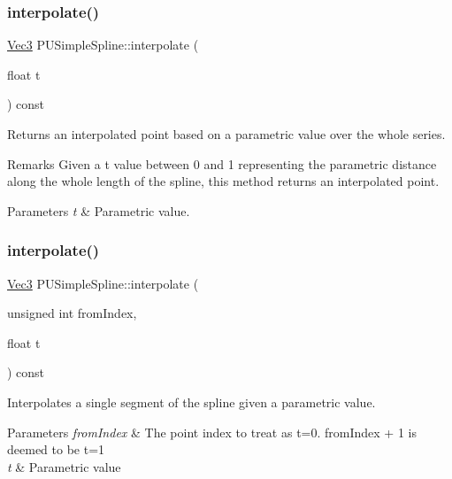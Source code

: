 \subsubsection{\texorpdfstring{interpolate()}{interpolate()}\hspace{0.1cm}{\footnotesize\ttfamily [2/4]}}
{\footnotesize\ttfamily \hyperlink{classVec3}{Vec3} P\+U\+Simple\+Spline\+::interpolate (\begin{DoxyParamCaption}\item[{float}]{t }\end{DoxyParamCaption}) const}

Returns an interpolated point based on a parametric value over the whole series. \begin{DoxyRemark}{Remarks}
Given a t value between 0 and 1 representing the parametric distance along the whole length of the spline, this method returns an interpolated point. 
\end{DoxyRemark}

\begin{DoxyParams}{Parameters}
{\em t} & Parametric value. \\
\hline
\end{DoxyParams}
\mbox{\label{classPUSimpleSpline_af723449337dfbead79ce52ba36f787e3}} 
\subsubsection{\texorpdfstring{interpolate()}{interpolate()}\hspace{0.1cm}{\footnotesize\ttfamily [3/4]}}
{\footnotesize\ttfamily \hyperlink{classVec3}{Vec3} P\+U\+Simple\+Spline\+::interpolate (\begin{DoxyParamCaption}\item[{unsigned int}]{from\+Index,  }\item[{float}]{t }\end{DoxyParamCaption}) const}

Interpolates a single segment of the spline given a parametric value. 
\begin{DoxyParams}{Parameters}
{\em from\+Index} & The point index to treat as t=0. from\+Index + 1 is deemed to be t=1 \\
\hline
{\em t} & Parametric value \\
\hline
\end{DoxyParams}
\mbox{\label{classPUSimpleSpline_af723449337dfbead79ce52ba36f787e3}} 
